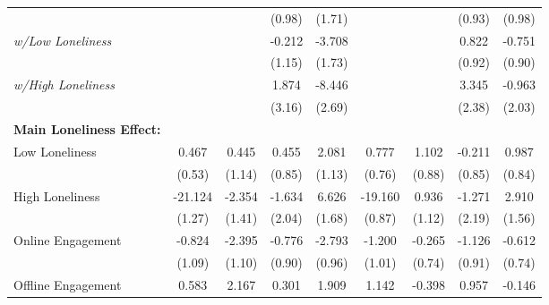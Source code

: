 \begin{table}[htbp]
\begin{tabular}{l*{8}{c}}
                              &             &             &(0.98)        &(1.71)        &             &             &(0.93)        &(0.98)        \\
\hspace{0.5cm} \emph{w/Low Loneliness}&             &             &-0.212        &-3.708\sym{*} &             &             &0.822        &-0.751        \\
                              &             &             &(1.15)        &(1.73)        &             &             &(0.92)        &(0.90)        \\
\hspace{0.5cm} \emph{w/High Loneliness}&             &             &1.874        &-8.446\sym{**}&             &             &3.345        &-0.963        \\
                              &             &             &(3.16)        &(2.69)        &             &             &(2.38)        &(2.03)        \\
\midrule \textbf{Main Loneliness Effect:}&             &             &             &             &             &             &             &             \\
\hspace{0.25cm} Low Loneliness&0.467        &0.445        &0.455        &2.081\sym{^+}&0.777        &1.102        &-0.211        &0.987        \\
                              &(0.53)        &(1.14)        &(0.85)        &(1.13)        &(0.76)        &(0.88)        &(0.85)        &(0.84)        \\
\hspace{0.25cm} High Loneliness&-21.124\sym{**}&-2.354        &-1.634        &6.626\sym{**}&-19.160\sym{**}&0.936        &-1.271        &2.910\sym{^+}\\
                              &(1.27)        &(1.41)        &(2.04)        &(1.68)        &(0.87)        &(1.12)        &(2.19)        &(1.56)        \\
\hspace{0.25cm} Online Engagement&-0.824        &-2.395\sym{*} &-0.776        &-2.793\sym{**}&-1.200        &-0.265        &-1.126        &-0.612        \\
                              &(1.09)        &(1.10)        &(0.90)        &(0.96)        &(1.01)        &(0.74)        &(0.91)        &(0.74)        \\
\hspace{0.25cm} Offline Engagement&0.583        &2.167\sym{^+}&0.301        &1.909\sym{*} &1.142        &-0.398        &0.957        &-0.146        \\

\end{tabular}
\end{table}
